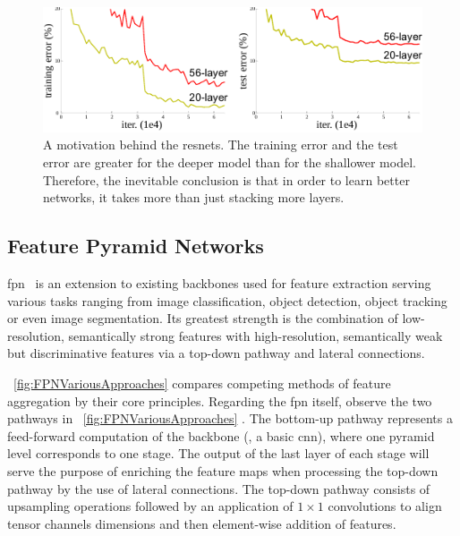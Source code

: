 \begin{figure}[t]
    \centerline{\includegraphics[width=0.8\linewidth]{figures/theoretical_foundations/resnet_motivation.pdf}}
    \caption[\gls{resnet} motivation]{A motivation behind the \glspl{resnet}. The training error and the test error are greater for the deeper model than for the shallower model. Therefore, the inevitable conclusion is that in order to learn better networks, it takes more than just stacking more layers. }
    \label{fig:ResnetMotivation}
\end{figure}

\subsection{Feature Pyramid Networks}
\label{ssec:FeaturePyramidNetworks}


\gls{fpn}~\cite{lin2017fpn} is an extension to existing backbones used for feature extraction serving various tasks ranging from image classification, object detection, object tracking or even image segmentation. Its greatest strength is the combination of low-resolution, semantically strong features with high-resolution, semantically weak but discriminative features via a top-down pathway and lateral connections.

\figtext{}~\ref{fig:FPNVariousApproaches} compares competing methods of feature aggregation by their core principles. Regarding the \gls{fpn} itself, observe the two pathways in \figtext{}~\ref{fig:FPNVariousApproaches} . The bottom-up pathway represents a feed-forward computation of the backbone (\egtext{}, a basic \gls{cnn}), where one pyramid level corresponds to one stage. The output of the last layer of each stage will serve the purpose of enriching the feature maps when processing the top-down pathway by the use of lateral connections. The top-down pathway consists of upsampling operations followed by an application of $1 \times 1$ convolutions to align tensor channels dimensions and then element-wise addition of features.

